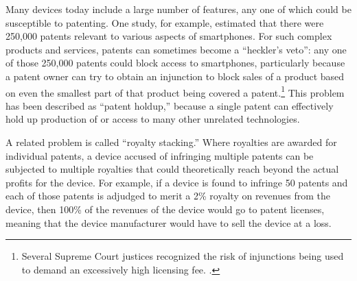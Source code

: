 \documentclass[11pt,twocolumn,titlepage]{article}
\begin{document}
Many devices today include a large number of features, any one
of which could be susceptible to patenting. One study, for example, estimated
that there were 250,000 patents relevant to various aspects of
smartphones.
For
such complex products and services, patents can sometimes become a ``heckler's
veto'': any one of those 250,000 patents could block access to smartphones,
particularly because a patent owner can try to obtain an injunction to block
sales of a product based on even the smallest part of that product being covered
a patent.\footnote{Several Supreme Court justices recognized the risk of
injunctions being used to demand an excessively high licensing fee.
.}
This problem has been described as
``patent holdup,'' because a single patent can effectively hold up production of
or access to many other unrelated technologies.

A related problem is called ``royalty stacking.'' Where royalties are awarded
for
individual patents, a device accused of infringing multiple patents can be
subjected to multiple royalties that could theoretically reach beyond the
actual profits for the device.
For example, if a device is found to infringe 50
patents and each of those patents is adjudged to merit a 2\% royalty on revenues
from the device, then 100\% of the revenues of the device would go to patent
licenses, meaning that the device manufacturer would have to sell the device at
a loss.
\end{document}
